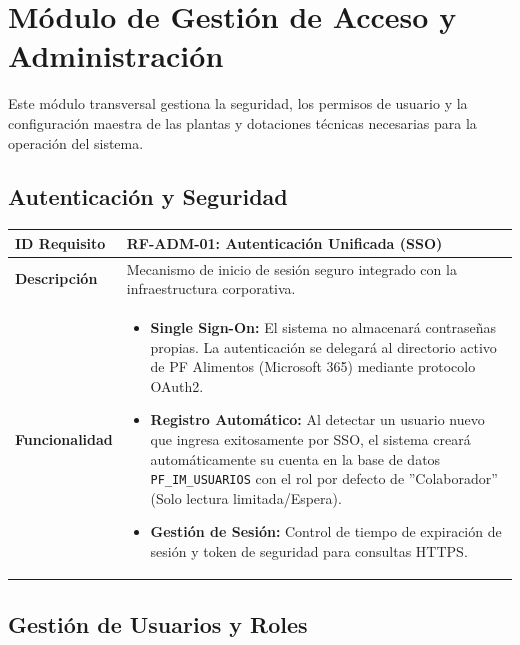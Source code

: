 \documentclass[11pt, letterpaper]{article}
\begin{document}
\section{Módulo de Gestión de Acceso y Administración}

Este módulo transversal gestiona la seguridad, los permisos de usuario y la configuración maestra de las plantas y dotaciones técnicas necesarias para la operación del sistema.

\subsection{Autenticación y Seguridad}

\begin{longtable}{|p{3.5cm}|p{11.5cm}|}
\hline
\rowcolor{headergray} \textbf{ID Requisito} & \textbf{RF-ADM-01: Autenticación Unificada (SSO)} \\ \hline
\textbf{Descripción} & Mecanismo de inicio de sesión seguro integrado con la infraestructura corporativa. \\ \hline
\textbf{Funcionalidad} & 
\begin{itemize}
    \item \textbf{Single Sign-On:} El sistema no almacenará contraseñas propias. La autenticación se delegará al directorio activo de PF Alimentos (Microsoft 365) mediante protocolo OAuth2.
    \item \textbf{Registro Automático:} Al detectar un usuario nuevo que ingresa exitosamente por SSO, el sistema creará automáticamente su cuenta en la base de datos \texttt{PF\_IM\_USUARIOS} con el rol por defecto de ''Colaborador'' (Solo lectura limitada/Espera).
    \item \textbf{Gestión de Sesión:} Control de tiempo de expiración de sesión y token de seguridad para consultas HTTPS.
\end{itemize} \\ \hline
\end{longtable}

\subsection{Gestión de Usuarios y Roles}
\end{document}
